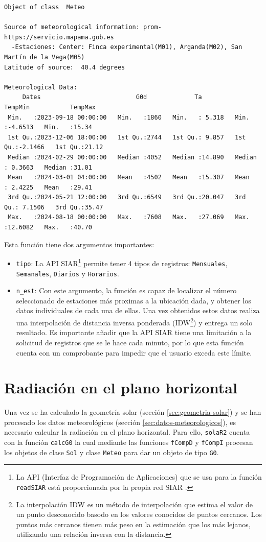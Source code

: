 \begin{verbatim}
Object of class  Meteo 

Source of meteorological information: prom-https://servicio.mapama.gob.es 
  -Estaciones: Center: Finca experimental(M01), Arganda(M02), San Martín de la Vega(M05) 
Latitude of source:  40.4 degrees

Meteorological Data:
     Dates                          G0d             Ta            TempMin           TempMax     
 Min.   :2023-09-18 00:00:00   Min.   :1860   Min.   : 5.318   Min.   :-4.6513   Min.   :15.34  
 1st Qu.:2023-12-06 18:00:00   1st Qu.:2744   1st Qu.: 9.857   1st Qu.:-2.1466   1st Qu.:21.12  
 Median :2024-02-29 00:00:00   Median :4052   Median :14.890   Median : 0.3663   Median :31.01  
 Mean   :2024-03-01 04:00:00   Mean   :4502   Mean   :15.307   Mean   : 2.4225   Mean   :29.41  
 3rd Qu.:2024-05-21 12:00:00   3rd Qu.:6549   3rd Qu.:20.047   3rd Qu.: 7.1506   3rd Qu.:35.47  
 Max.   :2024-08-18 00:00:00   Max.   :7608   Max.   :27.069   Max.   :12.6082   Max.   :40.70
\end{verbatim}

Esta función tiene dos argumentos importantes:
\begin{itemize}
\item \texttt{tipo}: La API SIAR\footnote{La API (Interfaz de Programación de Aplicaciones) que se usa para la función \texttt{readSIAR} está proporcionada por la propia red SIAR \cite{siar23}.} permite tener 4 tipos de registros: \texttt{Mensuales}, \texttt{Semanales}, \texttt{Diarios} y \texttt{Horarios}.
\item \texttt{n\_est}: Con este argumento, la función es capaz de localizar el número seleccionado de estaciones más proximas a la ubicación dada, y obtener los datos individuales de cada una de ellas. Una vez obtenidos estos datos realiza una interpolación de distancia inversa ponderada (IDW\footnote{La interpolación IDW es un método de interpolación que estima el valor de un punto desconocido basodo en los valores conocidos de puntos cercanos. Los puntos más cercanos tienen más peso en la estimación que los más lejanos, utilizando una relación inversa con la distancia.}) y entrega un solo resultado. Es importante añadir que la API SIAR tiene una limitación a la solicitud de registros que se le hace cada minuto, por lo que esta función cuenta con un comprobante para impedir que el usuario exceda este límite.
\end{itemize}

\section{Radiación en el plano horizontal}
\label{sec:org4eee7ba}
\label{sec:radiacion-plano-horizontal}
Una vez se ha calculado la geometría solar (sección \ref{sec:geometria-solar}) y se han procesado los datos meteorológicos (sección \ref{sec:datos-meteorologicos}), es necesario calcular la radiación en el plano horizontal. Para ello, \texttt{solaR2} cuenta con la función \texttt{calcG0} la cual mediante las funciones \texttt{fCompD} y \texttt{fCompI} procesan los objetos de clase \texttt{Sol} y clase \texttt{Meteo} para dar un objeto de tipo \texttt{G0}.

